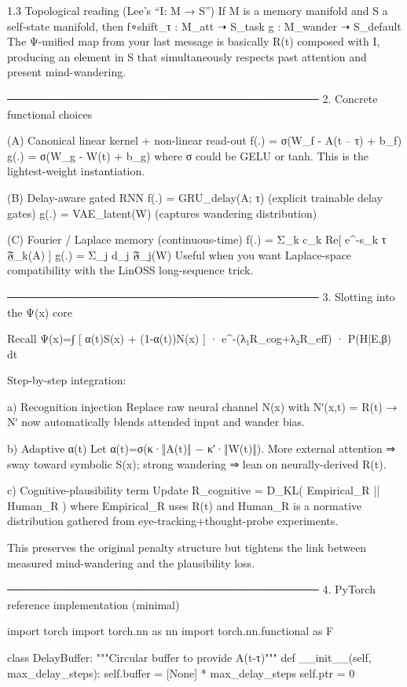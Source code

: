 1.3  Topological reading (Lee’s “I: M → S”)
If M is a memory manifold and S a self-state manifold, then
    f∘shift_τ : M_att ➝ S_task
    g         : M_wander ➝ S_default
The Ψ-unified map from your last message is basically R(t) composed with I, producing an element in S that simultaneously respects past attention and present mind-wandering.

────────────────────────────────────────
2.  Concrete functional choices

(A) Canonical linear kernel + non-linear read-out
    f(.) = σ(W_f -  A(t – τ) + b_f)
    g(.) = σ(W_g -  W(t)      + b_g)
where σ could be GELU or tanh.  This is the lightest-weight instantiation.

(B) Delay-aware gated RNN
    f(.) = GRU_delay(A; τ)            (explicit trainable delay gates)
    g(.) = VAE_latent(W)              (captures wandering distribution)

(C) Fourier / Laplace memory (continuous-time)
    f(.) = Σ_k c_k Re[ e^{-s_k τ} 𝔉_k(A) ]
    g(.) = Σ_j d_j 𝔉_j(W)
Useful when you want Laplace-space compatibility with the LinOSS long-sequence trick.

────────────────────────────────────────
3.  Slotting into the Ψ(x) core

Recall
    Ψ(x)=∫ [ α(t)S(x) + (1-α(t))N(x) ] · e^{-(λ₁R_cog+λ₂R_eff)} · P(H|E,β) dt

Step-by-step integration:

a) Recognition injection
   Replace raw neural channel N(x) with Nʹ(x,t) = R(t)
   → Nʹ now automatically blends attended input and wander bias.

b) Adaptive α(t)
   Let α(t)=σ(κ·‖A(t)‖ − κ′·‖W(t)‖).
   More external attention ⇒ sway toward symbolic S(x);
   strong wandering ⇒ lean on neurally-derived R(t).

c) Cognitive-plausibility term
   Update R_cognitive = D_KL( Empirical_R || Human_R )
   where Empirical_R uses R(t) and Human_R is a normative distribution gathered from eye-tracking+thought-probe experiments.

This preserves the original penalty structure but tightens the link between measured mind-wandering and the plausibility loss.

────────────────────────────────────────
4.  PyTorch reference implementation (minimal)

import torch
import torch.nn as nn
import torch.nn.functional as F

class DelayBuffer:
    """Circular buffer to provide A(t-τ)"""
    def __init__(self, max_delay_steps):
        self.buffer = [None] * max_delay_steps
        self.ptr = 0

